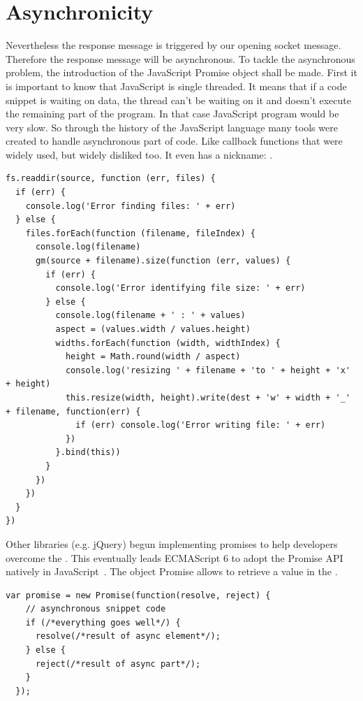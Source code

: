 \documentclass[11pt, a4paper, twoside, openright, openany]{book} %
\begin{document}
\section{Asynchronicity}

Nevertheless the response message is triggered by our opening socket message.
Therefore the response message will be asynchronous.
\newline
To tackle the asynchronous problem, the introduction of the JavaScript Promise object shall be made.
First it is important to know that JavaScript is single threaded.
It means that if a code snippet is waiting on data, the thread can't be waiting on it
and doesn't execute the remaining part of the program. In that case JavaScript program
would be very slow. So through the history of the JavaScript language many tools were
created to handle asynchronous part of code. Like callback functions that were widely
used, but widely disliked too. It even has a nickname: .
\bigbreak

\begin{lstlisting}[caption={Example of Callback Hell with its typical pyramid shape}, captionpos=b]
  fs.readdir(source, function (err, files) {
  if (err) {
    console.log('Error finding files: ' + err)
  } else {
    files.forEach(function (filename, fileIndex) {
      console.log(filename)
      gm(source + filename).size(function (err, values) {
        if (err) {
          console.log('Error identifying file size: ' + err)
        } else {
          console.log(filename + ' : ' + values)
          aspect = (values.width / values.height)
          widths.forEach(function (width, widthIndex) {
            height = Math.round(width / aspect)
            console.log('resizing ' + filename + 'to ' + height + 'x' + height)
            this.resize(width, height).write(dest + 'w' + width + '_' + filename, function(err) {
              if (err) console.log('Error writing file: ' + err)
            })
          }.bind(this))
        }
      })
    })
  }
})
\end{lstlisting}
\leavevmode \newline

Other libraries (e.g. jQuery) begun implementing promises to help developers overcome the .
This eventually leads ECMAScript 6 to adopt the Promise API~\cite{promise} natively in JavaScript~\cite{ecmaPromise}.
The object Promise allows to retrieve a value in the .
\bigbreak

\begin{lstlisting}[caption={Structure of a Promise}, captionpos=b]
  var promise = new Promise(function(resolve, reject) {
    // asynchronous snippet code
    if (/*everything goes well*/) {
      resolve(/*result of async element*/);
    } else {
      reject(/*result of async part*/);
    }
  });
\end{lstlisting}
\leavevmode \newline
\end{document}
